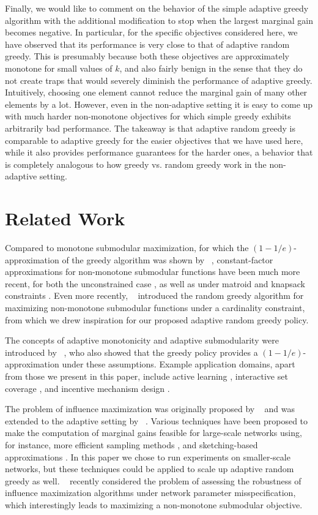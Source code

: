 \documentclass{article}
\newcommand{\citet}[1]{\citeauthor{#1}~\shortcite{#1}}
\begin{document}
Finally, we would like to comment on the behavior of the simple adaptive greedy algorithm with the additional modification to stop when the largest marginal gain becomes negative.
In particular, for the specific objectives considered here, we have observed that its performance is very close to that of adaptive random greedy.
This is presumably because both these objectives are approximately monotone for small values of $k$, and also fairly benign in the sense that they do not create traps that would severely diminish the performance of adaptive greedy.
Intuitively, choosing one element cannot reduce the marginal gain of many other elements by a lot.
However, even in the non-adaptive setting it is easy to come up with much harder non-monotone objectives for which simple greedy exhibits arbitrarily bad performance.
The takeaway is that adaptive random greedy is comparable to adaptive greedy for the easier objectives that we have used here, while it also provides performance guarantees for the harder ones, a behavior that is completely analogous to how greedy vs. random greedy work in the non-adaptive setting.

\section{Related Work}
Compared to monotone submodular maximization, for which the $(1-1/e)$-approximation of the greedy algorithm was shown by \citet{nemhauser78}, constant-factor approximations for non-monotone submodular functions have been much more recent, for both the unconstrained case \cite{feige07}, as well as under matroid and knapsack constraints \cite{lee09,chekuri11}.
Even more recently, \citet{buchbinder14} introduced the random greedy algorithm for maximizing non-monotone submodular functions under a cardinality constraint, from which we drew inspiration for our proposed adaptive random greedy policy.

The concepts of adaptive monotonicity and adaptive submodularity were introduced by \citet{golovin11}, who also showed that the greedy policy provides a $(1-1/e)$-approximation under these assumptions.
Example application domains, apart from those we present in this paper, include active learning \cite{chen14,chen15}, interactive set coverage \cite{guillory10}, and incentive mechanism design \cite{singla13}.

The problem of influence maximization was originally proposed by \citet{kempe03} and was extended to the adaptive setting by \citet{golovin11}.
Various techniques have been proposed to make the computation of marginal gains feasible for large-scale networks using, for instance, more efficient sampling methods \cite{ohsaka14}, and sketching-based approximations \cite{cohen14}.
In this paper we chose to run experiments on smaller-scale networks, but these techniques could be applied to scale up adaptive random greedy as well.
\citet{he14} recently considered the problem of assessing the robustness of influence maximization algorithms under network parameter misspecification, which interestingly leads to maximizing a non-monotone submodular objective.
\end{document}
